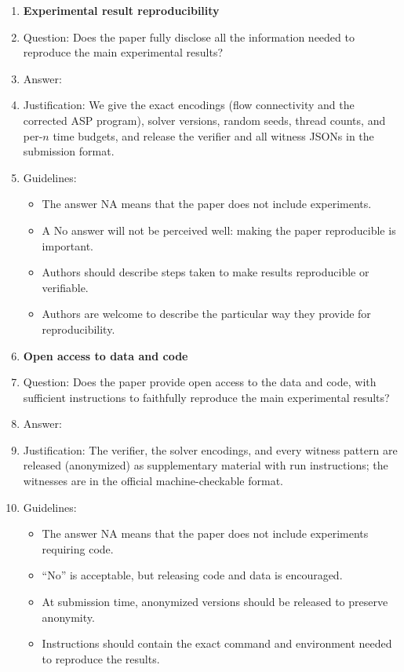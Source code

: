 \documentclass{article}
\begin{document}
\begin{enumerate}
    \item {\bf Experimental result reproducibility}
    \item[] Question: Does the paper fully disclose all the information needed to reproduce the main experimental results?
    \item[] Answer: \answerYes{}
    \item[] Justification: We give the exact encodings (flow connectivity and the corrected ASP program), solver versions, random seeds, thread counts, and per-$n$ time budgets, and release the verifier and all witness JSONs in the submission format.
    \item[] Guidelines:
    \begin{itemize}
        \item The answer NA means that the paper does not include experiments.
        \item A No answer will not be perceived well: making the paper reproducible is important.
        \item Authors should describe steps taken to make results reproducible or verifiable.
        \item Authors are welcome to describe the particular way they provide for reproducibility.
    \end{itemize}

\item {\bf Open access to data and code}
    \item[] Question: Does the paper provide open access to the data and code, with sufficient instructions to faithfully reproduce the main experimental results?
    \item[] Answer: \answerYes{}
    \item[] Justification: The verifier, the solver encodings, and every witness pattern are released (anonymized) as supplementary material with run instructions; the witnesses are in the official machine-checkable format.
    \item[] Guidelines:
    \begin{itemize}
        \item The answer NA means that the paper does not include experiments requiring code.
        \item ``No'' is acceptable, but releasing code and data is encouraged.
        \item At submission time, anonymized versions should be released to preserve anonymity.
        \item Instructions should contain the exact command and environment needed to reproduce the results.
    \end{itemize}


\end{enumerate}
\end{document}
